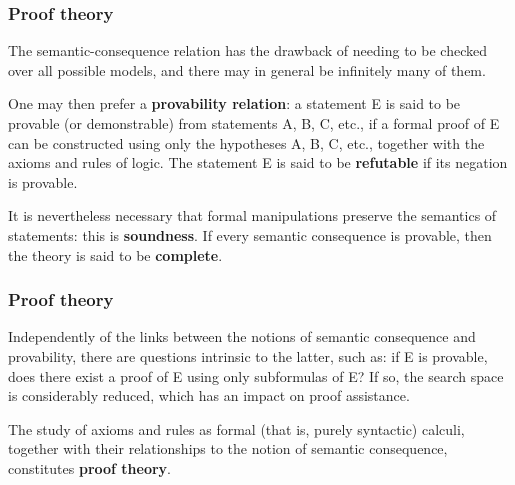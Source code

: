 \documentclass[compress,dvipdfmx]{beamer}
\begin{document}
%
\begin{frame}
  \frametitle{Proof theory}

  The semantic-consequence relation has the drawback of needing to be
  checked over all possible models, and there may in general be
  infinitely many of them.

  \bigskip

  One may then prefer a \textbf{provability relation}: a statement E
  is said to be provable (or demonstrable) from statements A, B, C,
  etc., if a formal proof of E can be constructed using only the
  hypotheses A, B, C, etc., together with the axioms and rules of
  logic. The statement E is said to be \textbf{refutable} if its
  negation is provable.

  \bigskip

  It is nevertheless necessary that formal manipulations preserve the
  semantics of statements: this is \textbf{soundness}. If every
  semantic consequence is provable, then the theory is said to be
  \textbf{complete}.

\end{frame}

%
\begin{frame}
\frametitle{Proof theory}

Independently of the links between the notions of semantic
consequence and provability, there are questions intrinsic to the
latter, such as: if E is provable, does there exist a proof of E
using only subformulas of E? If so, the search space is
considerably reduced, which has an impact on proof assistance.

\bigskip

The study of axioms and rules as formal (that is, purely syntactic)
calculi, together with their relationships to the notion of semantic
consequence, constitutes \textbf{proof theory}.

\end{frame}
\end{document}
